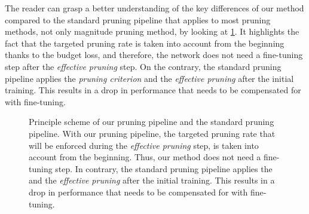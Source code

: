 The reader can grasp a better understanding of the key differences of our method
compared to the standard pruning pipeline that applies to most pruning methods,
not only magnitude pruning method, by looking at
\cref{fig:chap1:pruning_pipeline_comparison}. It highlights the fact that the
targeted pruning rate is taken into account from the beginning thanks to the
budget loss, and therefore, the network does not need a fine-tuning step after
the \emph{effective pruning} step. On the contrary, the standard pruning
pipeline applies the \emph{pruning criterion} and the \emph{effective pruning}
after the initial training. This results in a drop in performance that needs to
be compensated for with fine-tuning. \\

\begin{figure}
  \centering
    \caption{ Principle scheme of our pruning pipeline and the standard pruning
    pipeline. With our pruning pipeline, the targeted pruning rate that will be
    enforced during the \emph{effective pruning} step, is taken into account
    from the beginning. Thus, our method does not need a fine-tuning step. In
    contrary, the standard pruning pipeline applies the \DIFdelbeginFL \emph{}
\DIFdelendFL \DIFaddbeginFL \emph{}
    \DIFaddendFL and the \emph{effective pruning} after the initial training. This results in
    a drop in performance that needs to be compensated for with fine-tuning.}
  \label{fig:chap1:pruning_pipeline_comparison}
\end{figure}

